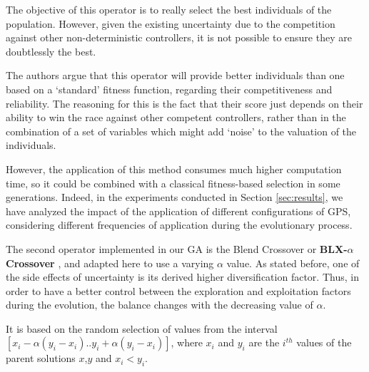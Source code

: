 \documentclass[10pt,journal,compsoc]{IEEEtran}
\begin{document}
The objective of this operator is to really select the best
individuals of the population. However, given the existing uncertainty
\cite{DBLP:journals/tcci/MereloLFGCCRMGTCC16} due to the competition against other non-deterministic controllers, it is not possible to ensure they are
doubtlessly the best. 

The authors argue that this operator will provide better individuals than one based on a `standard' fitness function, regarding their competitiveness and reliability. The reasoning for this is the fact that their score just depends on their ability to win the race against other competent controllers, rather than in the combination of a set of variables which might add `noise' to the valuation of the individuals.

However, the application of this method consumes much higher computation time, so it could be combined with a classical fitness-based selection in some generations. Indeed, in the experiments conducted in Section \ref{sec:results}, we have analyzed the impact of the application of different configurations of GPS, considering different frequencies of application during the evolutionary process.

The second operator implemented in our GA is the Blend Crossover or \textbf{BLX-$\alpha$ Crossover} \cite{blx2008}, and adapted here to use a varying $\alpha$ value. As stated before, one of the side effects of uncertainty is its derived higher diversification factor. Thus, in order to have a better control between the exploration and exploitation factors during the evolution, the balance changes with the decreasing value of $\alpha$.

It is based on the random selection of values from the interval
$[x_i-\alpha(y_i-x_i).. y_i+\alpha(y_i-x_i)]$, where $x_i$ and $y_i$
are the $i^{th}$ values of the parent solutions $x$,$y$ and
$x_i < y_i$. %

\end{document}
